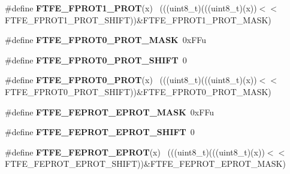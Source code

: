\begin{DoxyCompactItemize}
\item 
\hypertarget{group___f_t_f_e___register___masks_ga724ee43f3a2dc2269b758fb690ecabf4}{}\#define {\bfseries F\+T\+F\+E\+\_\+\+F\+P\+R\+O\+T1\+\_\+\+P\+R\+O\+T}(x)                                        ~(((uint8\+\_\+t)(((uint8\+\_\+t)(x))$<$$<$F\+T\+F\+E\+\_\+\+F\+P\+R\+O\+T1\+\_\+\+P\+R\+O\+T\+\_\+\+S\+H\+I\+F\+T))\&F\+T\+F\+E\+\_\+\+F\+P\+R\+O\+T1\+\_\+\+P\+R\+O\+T\+\_\+\+M\+A\+S\+K)\label{group___f_t_f_e___register___masks_ga724ee43f3a2dc2269b758fb690ecabf4}

\item 
\hypertarget{group___f_t_f_e___register___masks_gadeb846e611d1e77100baf8db858ae32c}{}\#define {\bfseries F\+T\+F\+E\+\_\+\+F\+P\+R\+O\+T0\+\_\+\+P\+R\+O\+T\+\_\+\+M\+A\+S\+K}~0x\+F\+Fu\label{group___f_t_f_e___register___masks_gadeb846e611d1e77100baf8db858ae32c}

\item 
\hypertarget{group___f_t_f_e___register___masks_gab968ce0cba033b854ff5ae5a5fbe2f34}{}\#define {\bfseries F\+T\+F\+E\+\_\+\+F\+P\+R\+O\+T0\+\_\+\+P\+R\+O\+T\+\_\+\+S\+H\+I\+F\+T}~0\label{group___f_t_f_e___register___masks_gab968ce0cba033b854ff5ae5a5fbe2f34}

\item 
\hypertarget{group___f_t_f_e___register___masks_ga4327d38226ecdc07171e821a679a73f0}{}\#define {\bfseries F\+T\+F\+E\+\_\+\+F\+P\+R\+O\+T0\+\_\+\+P\+R\+O\+T}(x)                                        ~(((uint8\+\_\+t)(((uint8\+\_\+t)(x))$<$$<$F\+T\+F\+E\+\_\+\+F\+P\+R\+O\+T0\+\_\+\+P\+R\+O\+T\+\_\+\+S\+H\+I\+F\+T))\&F\+T\+F\+E\+\_\+\+F\+P\+R\+O\+T0\+\_\+\+P\+R\+O\+T\+\_\+\+M\+A\+S\+K)\label{group___f_t_f_e___register___masks_ga4327d38226ecdc07171e821a679a73f0}

\item 
\hypertarget{group___f_t_f_e___register___masks_ga40c56d65eabafe8b67bf9e28a1ab2856}{}\#define {\bfseries F\+T\+F\+E\+\_\+\+F\+E\+P\+R\+O\+T\+\_\+\+E\+P\+R\+O\+T\+\_\+\+M\+A\+S\+K}~0x\+F\+Fu\label{group___f_t_f_e___register___masks_ga40c56d65eabafe8b67bf9e28a1ab2856}

\item 
\hypertarget{group___f_t_f_e___register___masks_gaf93b562d4d3aa274707f0cd10d19a3b3}{}\#define {\bfseries F\+T\+F\+E\+\_\+\+F\+E\+P\+R\+O\+T\+\_\+\+E\+P\+R\+O\+T\+\_\+\+S\+H\+I\+F\+T}~0\label{group___f_t_f_e___register___masks_gaf93b562d4d3aa274707f0cd10d19a3b3}

\item 
\hypertarget{group___f_t_f_e___register___masks_ga44bb3a7abcf20098b07feb87f7cb4638}{}\#define {\bfseries F\+T\+F\+E\+\_\+\+F\+E\+P\+R\+O\+T\+\_\+\+E\+P\+R\+O\+T}(x)                                      ~(((uint8\+\_\+t)(((uint8\+\_\+t)(x))$<$$<$F\+T\+F\+E\+\_\+\+F\+E\+P\+R\+O\+T\+\_\+\+E\+P\+R\+O\+T\+\_\+\+S\+H\+I\+F\+T))\&F\+T\+F\+E\+\_\+\+F\+E\+P\+R\+O\+T\+\_\+\+E\+P\+R\+O\+T\+\_\+\+M\+A\+S\+K)\label{group___f_t_f_e___register___masks_ga44bb3a7abcf20098b07feb87f7cb4638}


\end{DoxyCompactItemize}
